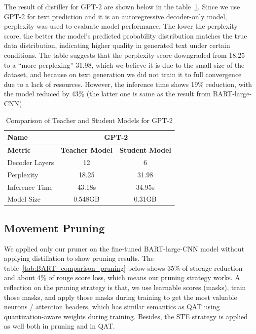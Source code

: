 \documentclass{article}
\begin{document}
    \hspace*{1em} The result of distiller for GPT-2 are shown below in the table~\ref{tab:gpt2_comparison}. Since we use GPT-2 for text prediction and it is an autoregressive decoder-only model, perplexity was used to evaluate model performance. The lower the perplexity score, the better the model's predicted probability distribution matches the true data distribution, indicating higher quality in generated text under certain conditions. The table suggests that the perplexity score downgraded from 18.25 to a ``more perplexing'' 31.98, which we believe it is due to the small size of the dataset, and because on text generation we did not train it to full convergence due to a lack of resources. However, the inference time shows 19\% reduction, with the model reduced by 43\% (the latter one is same as the result from BART-large-CNN).

    \begin{table}[h!]
        \centering
        \begin{tabular}{lcc}
            \toprule
            \textbf{Name}         & \multicolumn{2}{c}{\textbf{GPT-2}} \\ \midrule
            \textbf{Metric}       & \textbf{Teacher Model} & \textbf{Student Model} \\ \midrule
            Decoder Layers        & 12                     & 6                     \\
            Perplexity            & 18.25                  & 31.98                  \\
            Inference Time        & 43.18s                 & 34.95s                 \\
            Model Size            & 0.548GB                & 0.31GB                 \\ \bottomrule
        \end{tabular}
        \caption{Comparison of Teacher and Student Models for GPT-2}
        \label{tab:gpt2_comparison}
    \end{table}

    \subsection{Movement Pruning}
    \hspace*{1em} We applied only our pruner on the fine-tuned BART-large-CNN model without applying distillation to show pruning results. The table~\ref{tab:BART_comparison_pruning} below shows 35\% of storage reduction and about 4\% of rouge score loss, which means our pruning strategy works. A reflection on the pruning strategy is that, we use learnable scores (masks), train those masks, and apply those masks during training to get the most valuable neurons / attention headers, which has similar semantics as QAT using quantization-aware weights during training. Besides, the STE strategy is applied as well both in pruning and in QAT.
\end{document}
